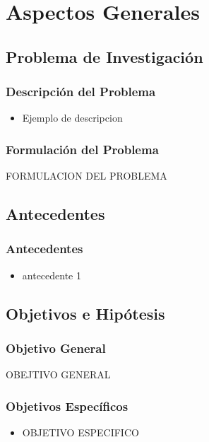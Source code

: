 \section{Aspectos Generales}
\subsection{Problema de Investigación}

\begin{frame}
\frametitle{Descripción del Problema}
\begin{itemize}
\item Ejemplo de descripcion
\end{itemize}
\end{frame}

\begin{frame}
\frametitle{Formulación del Problema}
FORMULACION DEL PROBLEMA
\end{frame}

\subsection{Antecedentes}
\begin{frame}
\frametitle{Antecedentes}
    \begin{itemize}
    \item antecedente 1
    \end{itemize}
\end{frame}
\subsection{Objetivos e Hipótesis}

\begin{frame}
\frametitle{Objetivo General}
OBEJTIVO GENERAL
\end{frame}

\begin{frame}
\frametitle{Objetivos Específicos}
   \begin{itemize}
   \item OBJETIVO ESPECIFICO
   \end{itemize}
\end{frame}

